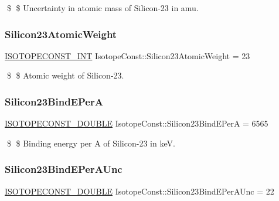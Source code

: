 \$ \$ Uncertainty in atomic mass of Silicon-\/23 in amu. \mbox{\label{group___isotope_const-_silicon-_si23_ga19ae890d696ade27c3ceb5f7e57a2c75}} 
\subsubsection{\texorpdfstring{Silicon23\+Atomic\+Weight}{Silicon23AtomicWeight}}
{\footnotesize\ttfamily \mbox{\hyperlink{group___isotope_const-_macros_ga5f18360b3e99483a35c32d789e62621c}{I\+S\+O\+T\+O\+P\+E\+C\+O\+N\+S\+T\+\_\+\+I\+NT}} Isotope\+Const\+::\+Silicon23\+Atomic\+Weight = 23}

\$ \$ Atomic weight of Silicon-\/23. \mbox{\label{group___isotope_const-_silicon-_si23_gab7757218b9b42d27113ac911bc12dffc}} 
\subsubsection{\texorpdfstring{Silicon23\+Bind\+E\+PerA}{Silicon23BindEPerA}}
{\footnotesize\ttfamily \mbox{\hyperlink{group___isotope_const-_macros_ga8f45a7272ce02c0b4c65c44636ed719a}{I\+S\+O\+T\+O\+P\+E\+C\+O\+N\+S\+T\+\_\+\+D\+O\+U\+B\+LE}} Isotope\+Const\+::\+Silicon23\+Bind\+E\+PerA = 6565}

\$ \$ Binding energy per A of Silicon-\/23 in keV. \mbox{\label{group___isotope_const-_silicon-_si23_ga78ee64fe4c8b870d223e4eede603b47d}} 
\subsubsection{\texorpdfstring{Silicon23\+Bind\+E\+Per\+A\+Unc}{Silicon23BindEPerAUnc}}
{\footnotesize\ttfamily \mbox{\hyperlink{group___isotope_const-_macros_ga8f45a7272ce02c0b4c65c44636ed719a}{I\+S\+O\+T\+O\+P\+E\+C\+O\+N\+S\+T\+\_\+\+D\+O\+U\+B\+LE}} Isotope\+Const\+::\+Silicon23\+Bind\+E\+Per\+A\+Unc = 22}

